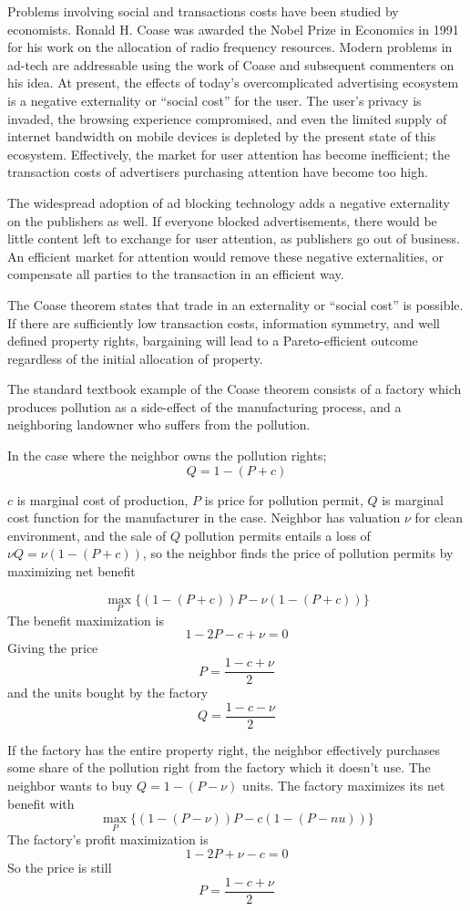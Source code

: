 \documentclass[11pt]{article}
\begin{document}
Problems involving social and transactions costs have been studied by
economists. Ronald H. Coase was awarded the Nobel Prize in Economics
in 1991 for his work on the allocation of radio frequency resources.\cite{19}
Modern problems in ad-tech are addressable using the work of Coase and
subsequent commenters on his idea. At present, the effects of today's
overcomplicated advertising ecosystem is a negative externality or
``social cost'' for the user. The user's privacy is invaded, the
browsing experience compromised, and even the limited supply of
internet bandwidth on mobile devices is depleted by the present state
of this ecosystem. Effectively, the market for user attention has
become inefficient; the transaction costs of advertisers purchasing
attention have become too high. 

The widespread adoption of ad blocking technology adds a negative
externality on the publishers as well. If everyone blocked
advertisements, there would be little content left to exchange for
user attention, as publishers go out of business. An efficient market
for attention would remove these negative externalities, or compensate
all parties to the transaction in an efficient way. 

The Coase theorem states that trade in an externality or ``social cost''
is possible. If there are sufficiently low transaction costs,
information symmetry, and well defined property rights, bargaining
will lead to a Pareto-efficient outcome regardless of the initial
allocation of property. 

The standard textbook example of the Coase theorem consists of a
factory which produces pollution as a side-effect of the manufacturing
process, and a neighboring landowner who suffers from the pollution. 

In the case where the neighbor owns the pollution rights;
  \[ Q= 1-(P + c) \]

$c$ is marginal cost of production, $P$ is price for pollution permit, $Q$ is marginal cost 
function for the manufacturer in the case. Neighbor has valuation $ \nu $ for clean environment,  and the sale of $Q$ pollution permits entails a loss of $ \nu Q = \nu(1-(P+c))$, so the neighbor finds the price of pollution permits by maximizing net benefit 

\[ \max_{P} \{ (1-(P+c))P - \nu(1-(P+c)) \} \]
The benefit maximization is \[1-2P -c + \nu = 0\]
Giving the price \[P =\frac{1-c+\nu}{2} \] and the units bought by the factory 
\[Q=\frac{1-c-\nu}{2} \]

   If the factory has the entire property right, the neighbor effectively purchases some share of the pollution right from the factory which it doesn't use. The neighbor wants to buy $Q=1-(P-\nu)$ units. The factory maximizes its net benefit with
   \[ \max_{P} \{ (1-(P-\nu))P - c(1-(P -nu)) \}  \]
   The factory's profit maximization is
   \[ 1-2P + \nu -c = 0\]
   So the price is still \[P=\frac{1-c+\nu}{2} \]
\end{document}
